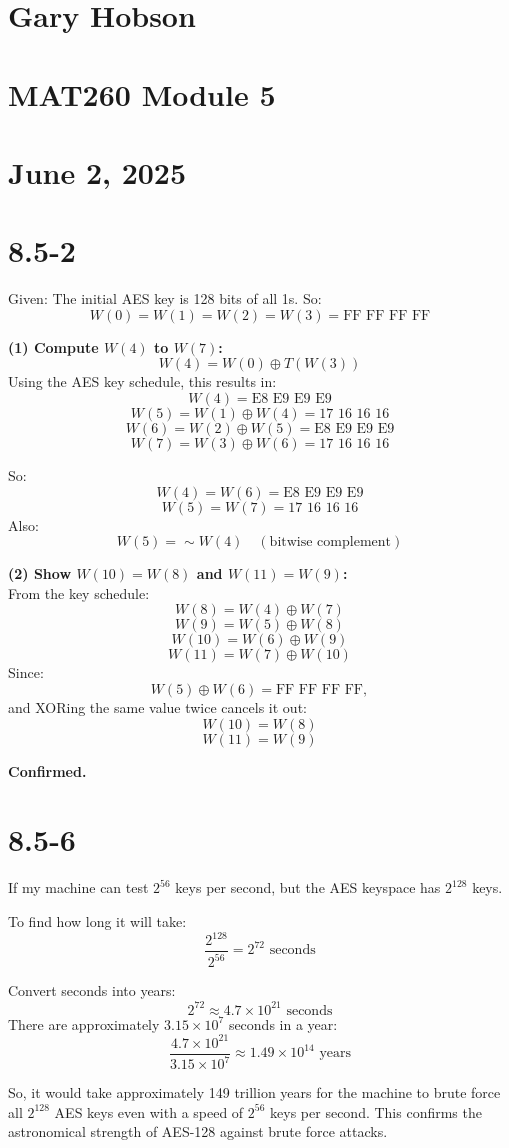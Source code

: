 \documentclass[12pt]{article}
\begin{document}
\section*{Gary Hobson}
\section*{MAT260 Module 5}
\section*{June 2, 2025}
\newpage



\section*{8.5-2}
Given: The initial AES key is 128 bits of all 1s. So:
\[
W(0) = W(1) = W(2) = W(3) = \text{FF FF FF FF}
\]

\textbf{(1) Compute \( W(4) \) to \( W(7) \):} \\
\[
W(4) = W(0) \oplus T(W(3))
\]
Using the AES key schedule, this results in:
\[
W(4) = \text{E8 E9 E9 E9}
\]
\[
W(5) = W(1) \oplus W(4) = \text{17 16 16 16}
\]
\[
W(6) = W(2) \oplus W(5) = \text{E8 E9 E9 E9}
\]
\[
W(7) = W(3) \oplus W(6) = \text{17 16 16 16}
\]

So:
\[
W(4) = W(6) = \text{E8 E9 E9 E9}
\]
\[
W(5) = W(7) = \text{17 16 16 16}
\]
Also:
\[
W(5) = \sim W(4) \quad (\text{bitwise complement})
\]

\textbf{(2) Show \( W(10) = W(8) \) and \( W(11) = W(9) \):} \\
From the key schedule:
\[
W(8) = W(4) \oplus W(7)
\]
\[
W(9) = W(5) \oplus W(8)
\]
\[
W(10) = W(6) \oplus W(9)
\]
\[
W(11) = W(7) \oplus W(10)
\]
Since:
\[
W(5) \oplus W(6) = \text{FF FF FF FF},
\]
and XORing the same value twice cancels it out:
\[
W(10) = W(8)
\]
\[
W(11) = W(9)
\]

\textbf{Confirmed.}

\newpage



\section*{8.5-6}
If my machine can test \( 2^{56} \) keys per second, but the AES keyspace has \( 2^{128} \) keys.

To find how long it will take:
\[
\frac{2^{128}}{2^{56}} = 2^{72} \text{ seconds}
\]

Convert seconds into years:
\[
2^{72} \approx 4.7 \times 10^{21} \text{ seconds}
\]
There are approximately \( 3.15 \times 10^{7} \) seconds in a year:
\[
\frac{4.7 \times 10^{21}}{3.15 \times 10^{7}} \approx 1.49 \times 10^{14} \text{ years}
\]

So, it would take approximately 149 trillion years for the machine to brute force all \( 2^{128} \) AES keys even with a speed of \( 2^{56} \) keys per second. This confirms the astronomical strength of AES-128 against brute force attacks.
\newpage
\end{document}
